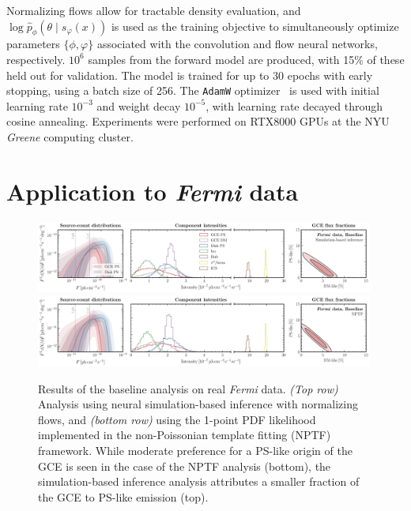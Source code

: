 \documentclass[]{article}
\newcommand{\Fermi}{\emph{Fermi}\xspace}
\begin{document}
Normalizing flows allow for tractable density evaluation, and $\log \hat p_\phi(\theta\mid s_\varphi(x))$ is used as the training objective to simultaneously optimize parameters $\{\phi,\varphi\}$ associated with the convolution and flow neural networks, respectively. $10^6$ samples from the forward model are produced, with 15\% of these held out for validation. The model is trained for up to 30 epochs with early stopping, using a batch size of 256. The \texttt{AdamW} optimizer~\cite{DBLP:journals/corr/KingmaB14,DBLP:conf/iclr/LoshchilovH19} is used with initial learning rate $10^{-3}$ and weight decay $10^{-5}$, with learning rate decayed through cosine annealing. Experiments were performed on RTX8000 GPUs at the NYU \emph{Greene} computing cluster.

\section{Application to \Fermi data}
\label{sec:experiments}

%
\begin{figure}
\includegraphics[width=0.99\textwidth]{figures/data_fid_sbi.pdf} \\
\includegraphics[width=0.99\textwidth]{figures/data_fid_nptf.pdf}
\caption{Results of the baseline analysis on real \Fermi data. \emph{(Top row)} Analysis using neural simulation-based inference with normalizing flows, and \emph{(bottom row)} using the 1-point PDF likelihood implemented in the non-Poissonian template fitting (NPTF) framework. While moderate preference for a PS-like origin of the GCE is seen in the case of the NPTF analysis (bottom), the simulation-based inference analysis attributes a smaller fraction of the GCE to PS-like emission (top).}
\label{fig:fid_data}
\end{figure}
%
\end{document}
